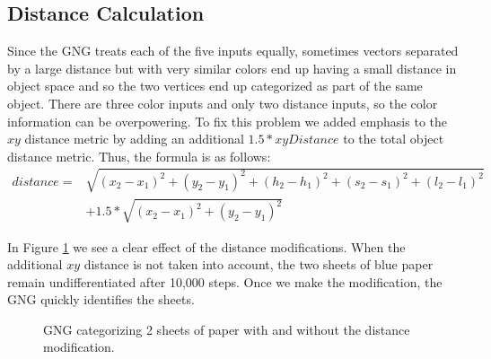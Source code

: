\documentclass{article}
\renewcommand{\|}{\origbar} %
\begin{document}
\subsection{Distance Calculation}


Since the GNG treats each of the five inputs equally, sometimes vectors separated by a large distance but with very similar colors end up having a small distance in object space and so the two vertices end up categorized as part of the same object. There are three color inputs and only two distance inputs, so the color information can be overpowering. To fix this problem we added emphasis to the $xy$ distance metric by adding an additional $1.5 * xyDistance$ to the total object distance metric. Thus, the formula is as follows:
\begin{align*}
  distance = &\sqrt{(x_2-x_1)^2+(y_2-y_1)^2+(h_2-h_1)^2+(s_2-s_1)^2+(l_2-l_1)^2} \\ &+ 1.5*\sqrt{(x_2-x_1)^2+(y_2-y_1)^2}
\end{align*}

In Figure \ref{fig:distModification} we see a clear effect of the distance modifications. When the additional $xy$ distance is not taken into account, the two sheets of blue paper remain undifferentiated after 10,000 steps. Once we make the modification, the GNG quickly identifies the sheets.

\begin{figure}[h!]
  \centering


  \caption{GNG categorizing 2 sheets of paper with and without the distance modification.}
  \label{fig:distModification}
\end{figure}
\end{document}

